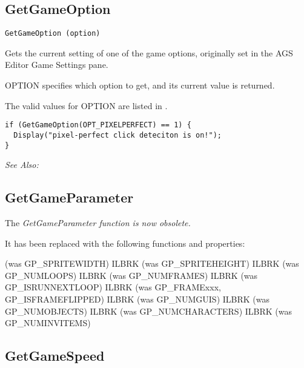 \subsection{GetGameOption}\label{GetGameOption}%

\begin{verbatim}
GetGameOption (option)
\end{verbatim}

Gets the current setting of one of the game options, originally set in the AGS Editor
Game Settings pane.

OPTION specifies which option to get, and its current value is returned.

The valid values for OPTION are listed in .

\begin{verbatim}
if (GetGameOption(OPT_PIXELPERFECT) == 1) {
  Display("pixel-perfect click deteciton is on!");
}
\end{verbatim}

\it{See Also:} 



\subsection{GetGameParameter}\label{GetGameParameter}%

The \it{GetGameParameter} function is now obsolete.

It has been replaced with the following functions and properties:

 (was GP_SPRITEWIDTH) ILBRK
 (was GP_SPRITEHEIGHT) ILBRK
 (was GP_NUMLOOPS) ILBRK
 (was GP_NUMFRAMES) ILBRK
 (was GP_ISRUNNEXTLOOP) ILBRK
 (was GP_FRAMExxx, GP_ISFRAMEFLIPPED) ILBRK
 (was GP_NUMGUIS) ILBRK
 (was GP_NUMOBJECTS) ILBRK
 (was GP_NUMCHARACTERS) ILBRK
(was GP_NUMINVITEMS)


\subsection{GetGameSpeed}\label{GetGameSpeed}%

